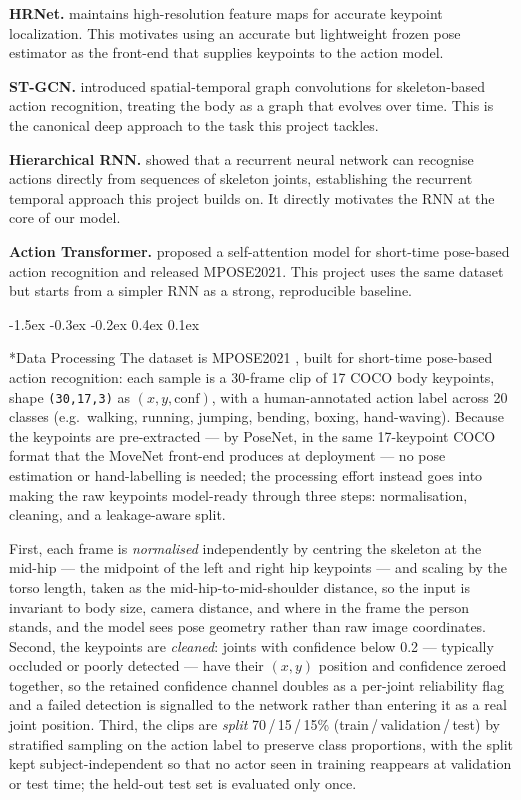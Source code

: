 \documentclass[final]{article}
\makeatletter
\renewcommand{\section}{%
  \@startsection{section}{1}{\z@}%
                {-1.5ex \@plus -0.3ex \@minus -0.2ex}%
                {0.4ex \@plus 0.1ex}%
                {\large\bf\raggedright}%
}
\makeatother
\begin{document}
\textbf{HRNet.} \citet{sun2019hrnet} maintains high-resolution feature maps for accurate keypoint localization. This motivates using an accurate but lightweight frozen pose estimator as the front-end that supplies keypoints to the action model.

\textbf{ST-GCN.} \citet{yan2018stgcn} introduced spatial-temporal graph convolutions for skeleton-based action recognition, treating the body as a graph that evolves over time. This is the canonical deep approach to the task this project tackles.

\textbf{Hierarchical RNN.} \citet{du2015hierarchical} showed that a recurrent neural network can recognise actions directly from sequences of skeleton joints, establishing the recurrent temporal approach this project builds on. It directly motivates the RNN at the core of our model.

\textbf{Action Transformer.} \citet{mazzia2021action} proposed a self-attention model for short-time pose-based action recognition and released MPOSE2021. This project uses the same dataset but starts from a simpler RNN as a strong, reproducible baseline.

\section*{Data Processing}
The dataset is MPOSE2021 \citep{mazzia2021action,mpose2021zenodo,pic4ser2021mpose}, built for short-time pose-based action recognition: each sample is a 30-frame clip of 17 COCO body keypoints, shape \texttt{(30,17,3)} as $(x,y,\mathrm{conf})$, with a human-annotated action label across 20 classes (e.g.\ walking, running, jumping, bending, boxing, hand-waving). Because the keypoints are pre-extracted --- by PoseNet, in the same 17-keypoint COCO format that the MoveNet front-end produces at deployment --- no pose estimation or hand-labelling is needed; the processing effort instead goes into making the raw keypoints model-ready through three steps: normalisation, cleaning, and a leakage-aware split.

First, each frame is \emph{normalised} independently by centring the skeleton at the mid-hip --- the midpoint of the left and right hip keypoints --- and scaling by the torso length, taken as the mid-hip-to-mid-shoulder distance, so the input is invariant to body size, camera distance, and where in the frame the person stands, and the model sees pose geometry rather than raw image coordinates. Second, the keypoints are \emph{cleaned}: joints with confidence below 0.2 --- typically occluded or poorly detected --- have their $(x,y)$ position and confidence zeroed together, so the retained confidence channel doubles as a per-joint reliability flag and a failed detection is signalled to the network rather than entering it as a real joint position. Third, the clips are \emph{split} 70\,/\,15\,/\,15\% (train\,/\,validation\,/\,test) by stratified sampling on the action label to preserve class proportions, with the split kept subject-independent so that no actor seen in training reappears at validation or test time; the held-out test set is evaluated only once.
\end{document}
